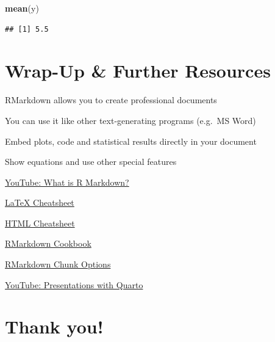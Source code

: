 \documentclass[
]{book}
\newenvironment{Shaded}{\begin{snugshade}}{\end{snugshade}}
\newcommand{\FunctionTok}[1]{\textcolor[rgb]{0.13,0.29,0.53}{\textbf{#1}}}
\newcommand{\NormalTok}[1]{#1}
\begin{document}
\begin{Shaded}
\begin{Highlighting}[]
\FunctionTok{mean}\NormalTok{(y)}
\end{Highlighting}
\end{Shaded}

\begin{verbatim}
## [1] 5.5
\end{verbatim}

\section{Wrap-Up \& Further Resources}\label{wrap-up-further-resources-8}

RMarkdown allows you to create professional documents

You can use it like other text-generating programs (e.g.~MS Word)

Embed plots, code and statistical results directly in your document

Show equations and use other special features

\href{https://www.youtube.com/watch?v=asHhuHRxhvo&ab_channel=EquitableEquations/}{YouTube: What is R Markdown?}

\href{https://wch.github.io/latexsheet/}{LaTeX Cheatsheet}

\href{https://web.stanford.edu/group/csp/cs21/htmlcheatsheet.pdf}{HTML Cheatsheet}

\href{https://bookdown.org/yihui/rmarkdown-cookbook/}{RMarkdown Cookbook}

\href{https://yihui.org/knitr/options/}{RMarkdown Chunk Options}

\href{https://www.youtube.com/watch?v=01KifhHDkFk&ab_channel=EquitableEquations}{YouTube: Presentations with Quarto}

\section{Thank you!}\label{thank-you-3}
\end{document}
